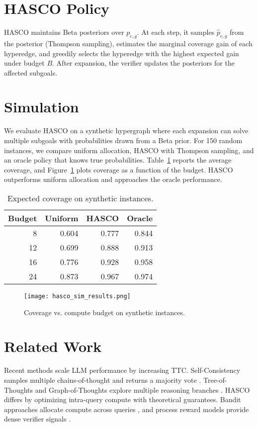\documentclass{article}
\begin{document}
\section{HASCO Policy}
HASCO maintains Beta posteriors over $p_{e,g}$. At each step, it samples $\hat{p}_{e,g}$ from the posterior (Thompson sampling), estimates the marginal coverage gain of each hyperedge, and greedily selects the hyperedge with the highest expected gain under budget $B$. After expansion, the verifier updates the posteriors for the affected subgoals.

\section{Simulation}
We evaluate HASCO on a synthetic hypergraph where each expansion can solve multiple subgoals with probabilities drawn from a Beta prior. For 150 random instances, we compare uniform allocation, HASCO with Thompson sampling, and an oracle policy that knows true probabilities. Table~\ref{tab:sim} reports the average coverage, and Figure~\ref{fig:sim} plots coverage as a function of the budget. HASCO outperforms uniform allocation and approaches the oracle performance.

\begin{table}[ht]
\centering
\caption{Expected coverage on synthetic instances.}
\label{tab:sim}
\begin{tabular}{rrrr}
\hline
Budget & Uniform & HASCO & Oracle \\\hline
8 & 0.604 & 0.777 & 0.844\\
12 & 0.699 & 0.888 & 0.913\\
16 & 0.776 & 0.928 & 0.958\\
24 & 0.873 & 0.967 & 0.974\\\hline
\end{tabular}
\end{table}

\begin{figure}[ht]
\centering
\texttt{[image: hasco\_sim\_results.png]}
\caption{Coverage vs. compute budget on synthetic instances.}
\label{fig:sim}
\end{figure}

\section{Related Work}
Recent methods scale LLM performance by increasing TTC. Self-Consistency samples multiple chains-of-thought and returns a majority vote \citep{Wang2022SelfConsistency}. Tree-of-Thoughts and Graph-of-Thoughts explore multiple reasoning branches \citep{Yao2023TreeOfThought,Besta2023GraphOfThought}. HASCO differs by optimizing intra-query compute with theoretical guarantees. Bandit approaches allocate compute across queries \citep{Zuo2025BanditTTC}, and process reward models provide dense verifier signals \citep{Lightman2024PRM}.
\end{document}
